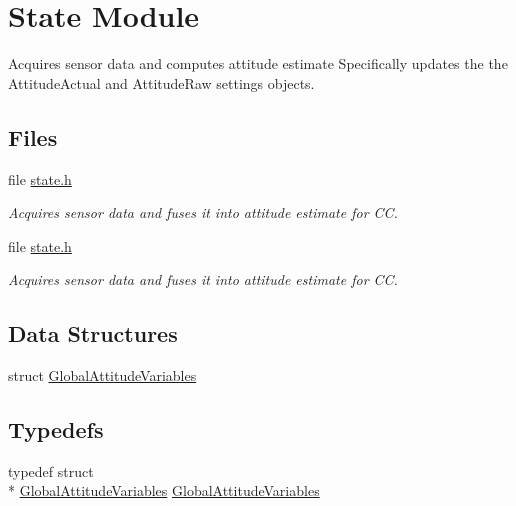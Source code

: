 \hypertarget{group___state}{\section{State Module}
\label{group___state}
}


Acquires sensor data and computes attitude estimate Specifically updates the the Attitude\-Actual and Attitude\-Raw settings objects.  


\subsection*{Files}
\begin{DoxyCompactItemize}
\item 
file \hyperlink{state_8h}{state.\-h}
\begin{DoxyCompactList}\small\item\em Acquires sensor data and fuses it into attitude estimate for C\-C. \end{DoxyCompactList}\item 
file \hyperlink{state_8h}{state.\-h}
\begin{DoxyCompactList}\small\item\em Acquires sensor data and fuses it into attitude estimate for C\-C. \end{DoxyCompactList}\end{DoxyCompactItemize}
\subsection*{Data Structures}
\begin{DoxyCompactItemize}
\item 
struct \hyperlink{struct_global_attitude_variables}{Global\-Attitude\-Variables}
\end{DoxyCompactItemize}
\subsection*{Typedefs}
\begin{DoxyCompactItemize}
\item 
typedef struct \\*
\hyperlink{struct_global_attitude_variables}{Global\-Attitude\-Variables} \hyperlink{group___state_ga02f6c6dfdf0ff8ff2b30b24205c6b1f8}{Global\-Attitude\-Variables}
\end{DoxyCompactItemize}
